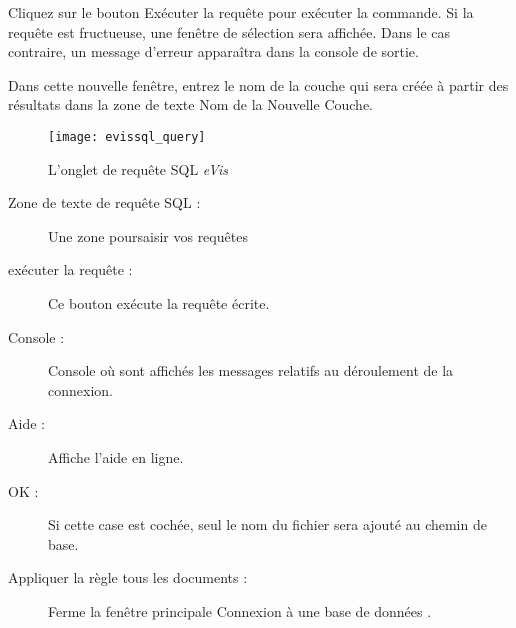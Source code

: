 
Cliquez sur le bouton Exécuter la requête pour exécuter la commande. Si la requête est fructueuse, une fenêtre de sélection sera affichée. Dans le cas contraire, un message d'erreur apparaîtra dans la console de sortie.


Dans cette nouvelle fenêtre, entrez le nom de la couche qui sera créée à partir des résultats dans la zone de texte Nom de la Nouvelle Couche.

\begin{figure}[ht]
   \begin{center}
\texttt{[image: evissql\_query]}
\caption{L'onglet de requête SQL \emph{eVis} \nixcaption}\label{evissql_query}
\end{center}
\end{figure}

\begin{description}
\item[Zone de texte de requête SQL :] Une zone poursaisir vos requêtes
\item[exécuter la requête :] Ce bouton exécute la requête écrite.
\item[Console :] Console où sont affichés les messages relatifs au déroulement de la connexion.
\item[Aide :] Affiche l'aide en ligne.
\item[OK :] Si cette case est cochée, seul le nom du fichier sera ajouté au chemin de base.
\item[Appliquer la règle tous les documents :] Ferme la fenêtre principale Connexion à une base de données .
\end{description}

